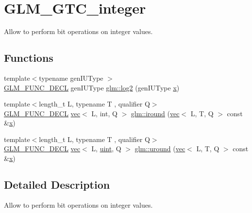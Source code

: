 \hypertarget{group__gtc__integer}{}\section{G\+L\+M\+\_\+\+G\+T\+C\+\_\+integer}
\label{group__gtc__integer}


Allow to perform bit operations on integer values.  


\subsection*{Functions}
\begin{DoxyCompactItemize}
\item 
{\footnotesize template$<$typename gen\+I\+U\+Type $>$ }\\\hyperlink{setup_8hpp_ab2d052de21a70539923e9bcbf6e83a51}{G\+L\+M\+\_\+\+F\+U\+N\+C\+\_\+\+D\+E\+CL} gen\+I\+U\+Type \hyperlink{group__gtc__integer_ga9bd682e74bfacb005c735305207ec417}{glm\+::log2} (gen\+I\+U\+Type \hyperlink{_s_d_l__opengl_8h_ad0e63d0edcdbd3d79554076bf309fd47}{x})
\item 
{\footnotesize template$<$length\+\_\+t L, typename T , qualifier Q$>$ }\\\hyperlink{setup_8hpp_ab2d052de21a70539923e9bcbf6e83a51}{G\+L\+M\+\_\+\+F\+U\+N\+C\+\_\+\+D\+E\+CL} \hyperlink{structglm_1_1vec}{vec}$<$ L, int, Q $>$ \hyperlink{group__gtc__integer_ga57824268ebe13a922f1d69a5d37f637f}{glm\+::iround} (\hyperlink{structglm_1_1vec}{vec}$<$ L, T, Q $>$ const \&\hyperlink{_s_d_l__opengl_8h_ad0e63d0edcdbd3d79554076bf309fd47}{x})
\item 
{\footnotesize template$<$length\+\_\+t L, typename T , qualifier Q$>$ }\\\hyperlink{setup_8hpp_ab2d052de21a70539923e9bcbf6e83a51}{G\+L\+M\+\_\+\+F\+U\+N\+C\+\_\+\+D\+E\+CL} \hyperlink{structglm_1_1vec}{vec}$<$ L, \hyperlink{group__core__precision_ga4fd29415871152bfb5abd588334147c8}{uint}, Q $>$ \hyperlink{group__gtc__integer_ga6715b9d573972a0f7763d30d45bcaec4}{glm\+::uround} (\hyperlink{structglm_1_1vec}{vec}$<$ L, T, Q $>$ const \&\hyperlink{_s_d_l__opengl_8h_ad0e63d0edcdbd3d79554076bf309fd47}{x})
\end{DoxyCompactItemize}


\subsection{Detailed Description}
Allow to perform bit operations on integer values. 

